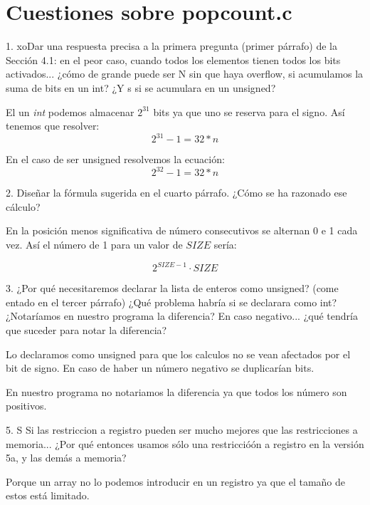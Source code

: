 \section*{Cuestiones sobre popcount.c}

\begin{ejercicio}{1. xoDar una respuesta precisa a la primera pregunta
    (primer párrafo) de la Sección 4.1: en el peor caso, cuando todos
    los elementos tienen todos los bits activados... ¿cómo de grande
    puede ser N sin que haya overflow, si acumulamos la suma de
    bits en un int? ¿Y s si se acumulara en un unsigned?}

  El un \textit{int} podemos almacenar $2^{31}$ bits ya que uno se reserva para el signo. Así tenemos que resolver:
  $$ 2^{31}-1 = 32*n$$

  En el caso de ser unsigned resolvemos la ecuación:
  $$ 2^{32}-1 = 32*n$$
\end{ejercicio}

\begin{ejercicio}{2. Diseñar la fórmula sugerida en el cuarto
    párrafo. ¿Cómo se ha razonado ese cálculo?}

  En la posición menos significativa de número consecutivos se alternan 0 e 1 cada vez. Así el número de 1 para un valor de $SIZE$ sería:

  $$2^{SIZE-1}\cdot SIZE$$


\end{ejercicio}

\newpage

\begin{ejercicio}{3. ¿Por qué necesitaremos declarar la lista de enteros
    como unsigned? (come entado en el tercer párrafo) ¿Qué
    problema habría si se declarara como int? ¿Notaríamos en
    nuestro programa la diferencia?  En caso negativo... ¿qué
    tendría que suceder para notar la diferencia?}

  Lo declaramos como unsigned para que los calculos no se vean
  afectados por el bit de signo. En caso de haber un número negativo se duplicarían bits.

  En nuestro programa no notariamos la diferencia ya que todos los
  número son positivos.
  
\end{ejercicio}

\begin{ejercicio}{5. S Si las restriccion a registro pueden ser mucho
    mejores que las restricciones a memoria...  ¿Por qué entonces
    usamos sólo una restriccióón a registro en la versión 5a, y
    las demás a memoria?}

  Porque un array no lo podemos introducir en un registro ya que el
  tamaño de estos está limitado.
  
\end{ejercicio}

